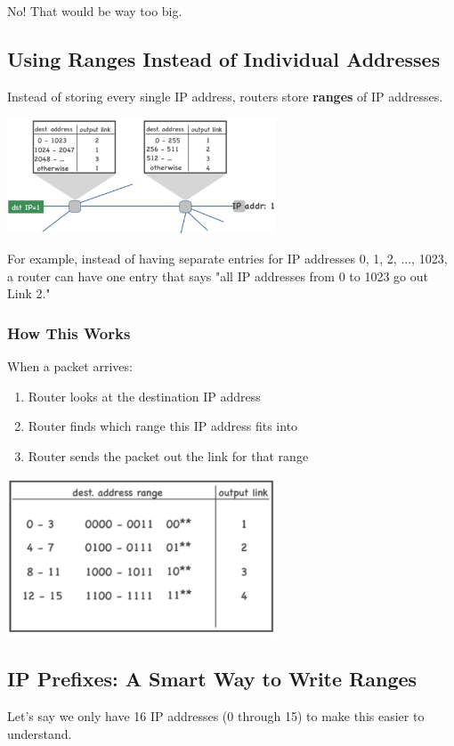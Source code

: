 \documentclass[../../compsys.tex]{subfiles}
\begin{document}
No! That would be way too big.

\subsection{Using Ranges Instead of Individual Addresses}
Instead of storing every single IP address, routers store \textbf{ranges} of IP addresses.

\begin{center}
    \includegraphics[width=0.6\textwidth]{images/ranges.png}
\end{center}

For example, instead of having separate entries for IP addresses 0, 1, 2, ..., 1023, a router can have one entry that says "all IP addresses from 0 to 1023 go out Link 2."

\subsubsection{How This Works}
When a packet arrives:
\begin{enumerate}
    \item Router looks at the destination IP address
    \item Router finds which range this IP address fits into
    \item Router sends the packet out the link for that range
\end{enumerate}

\begin{center}
    \includegraphics[width=0.6\textwidth]{images/ranges-2.png}
\end{center}

\subsection{IP Prefixes: A Smart Way to Write Ranges}
Let's say we only have 16 IP addresses (0 through 15) to make this easier to understand.
\end{document}
